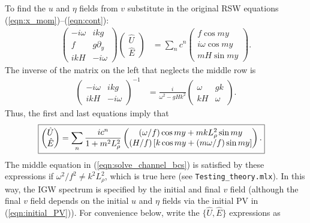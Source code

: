 \documentclass[10pt,reqno]{amsart}
\begin{document}
To find the $u$ and $\eta$ fields from $v$ substitute in the original RSW equations (\ref{eqn:x_mom})--(\ref{eqn:cont}):
\begin{align}
\begin{pmatrix}
- i \omega  & i k g \\
f & g \partial_y \\
i k H  & - i \omega
\end{pmatrix}
\begin{pmatrix}
\hat{U} \\
\hat{E}
\end{pmatrix} & = 
\sum_n c^n
\begin{pmatrix}
f  \cos m y \\
i \omega \cos m y \\
m H \sin m y
\end{pmatrix} .
\label{eqn:solve_channel_bcs}
\end{align}
The inverse of the matrix on the left that neglects the middle row is
\begin{align}
\begin{pmatrix}
- i \omega  & i k g \\
i k H  & - i \omega
\end{pmatrix}^{-1} & =
\frac{i}{\omega^2 - g H k^2 } \begin{pmatrix}
\omega  & g k \\
k H  & \omega
\end{pmatrix} .
\end{align}
Thus, the first and last equations imply that
\begin{align}
\Aboxed{
\begin{pmatrix}
\hat{U} \\
\hat{E}
\end{pmatrix} & = 
\sum_n \frac{i c^n}{1 + m^2 L_\rho^2}
\begin{pmatrix}
(\omega / f)  \cos m y  + m k L_\rho^2 \sin m y \\
(H/f) \left[ k \cos m y  + (m \omega /f) \sin m y \right]
\end{pmatrix} .}
\label{eqn:channel_U_hat_E_hat}
\end{align}
The middle equation in (\ref{eqn:solve_channel_bcs}) is satisfied by these expressions if $\omega^2 / f^2 \neq k^2 L_\rho^2$, which is true here (see \texttt{Testing\_theory.mlx}).
In this way, the IGW spectrum is specified by the initial and final $v$ field (although the final $v$ field depends on the initial $u$ and $\eta$ fields via the initial PV in (\ref{eqn:initial_PV})).
For convenience below, write the $\{ \hat{U}, \hat{E} \}$ expressions as
\end{document}
